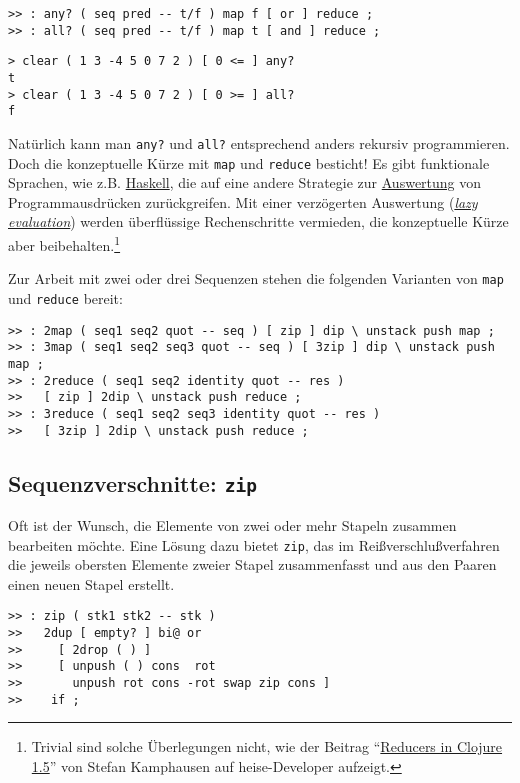 \begin{verbatim}
>> : any? ( seq pred -- t/f ) map f [ or ] reduce ;
>> : all? ( seq pred -- t/f ) map t [ and ] reduce ;
\end{verbatim}

\begin{verbatim}
> clear ( 1 3 -4 5 0 7 2 ) [ 0 <= ] any?
t
> clear ( 1 3 -4 5 0 7 2 ) [ 0 >= ] all?
f
\end{verbatim}

Natürlich kann man \verb|any?| und \verb|all?| entsprechend anders rekursiv programmieren. Doch die konzeptuelle Kürze mit \verb|map| und \verb|reduce| besticht! Es gibt funktionale Sprachen, wie z.B. \href{http://de.wikipedia.org/wiki/Haskell_(Programmiersprache)}{Haskell}, die auf eine andere Strategie zur \href{http://de.wikipedia.org/wiki/Auswertung_(Informatik)}{Auswertung} von Programmausdrücken zurückgreifen. Mit einer verzögerten Auswertung (\href{http://en.wikipedia.org/wiki/Lazy_evaluation}{\emph{lazy evaluation}}) werden überflüssige Rechenschritte vermieden, die konzeptuelle Kürze aber beibehalten.\footnote{Trivial sind solche Überlegungen nicht, wie der Beitrag "`\href{http://heise.de/-1871934}{Reducers in Clojure 1.5}"' von Stefan Kamphausen auf heise-Developer aufzeigt.}

Zur Arbeit mit zwei oder drei Sequenzen stehen die folgenden Varianten von \verb|map| und \verb|reduce| bereit:

\begin{verbatim}
>> : 2map ( seq1 seq2 quot -- seq ) [ zip ] dip \ unstack push map ;
>> : 3map ( seq1 seq2 seq3 quot -- seq ) [ 3zip ] dip \ unstack push map ;
>> : 2reduce ( seq1 seq2 identity quot -- res )
>>   [ zip ] 2dip \ unstack push reduce ;
>> : 3reduce ( seq1 seq2 seq3 identity quot -- res )
>>   [ 3zip ] 2dip \ unstack push reduce ;
\end{verbatim}

\subsection{Sequenzverschnitte: \texttt{zip}}

Oft ist der Wunsch, die Elemente von zwei oder mehr Stapeln zusammen bearbeiten möchte. Eine Lösung dazu bietet \verb|zip|, das im Reißverschlußverfahren die jeweils obersten Elemente zweier Stapel zusammenfasst und aus den Paaren einen neuen Stapel erstellt. 

\begin{verbatim}
>> : zip ( stk1 stk2 -- stk )
>>   2dup [ empty? ] bi@ or
>>     [ 2drop ( ) ]
>>     [ unpush ( ) cons  rot
>>       unpush rot cons -rot swap zip cons ]
>>    if ;
\end{verbatim}

